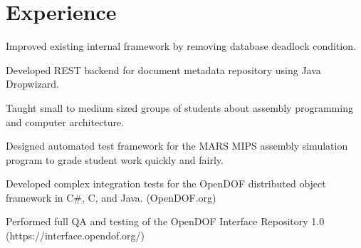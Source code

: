 \documentclass[letterpaper]{deedy-resume} %
\begin{document}
\begin{minipage}[t]{0.64\textwidth} %


\section{Experience}

\vspace{\topsep} %
\begin{tightitemize}
\item Improved existing internal framework by removing database deadlock condition.
\item Developed REST backend for document metadata repository using Java Dropwizard.
\end{tightitemize}


\begin{tightitemize}
\item Taught small to medium sized groups of students about assembly programming and computer architecture.
\item Designed automated test framework for the MARS MIPS assembly simulation program to grade student work quickly and fairly.
\end{tightitemize}


\vspace{\topsep} %
\begin{tightitemize}
\item Developed complex integration tests for the OpenDOF distributed object framework in C\#, C, and Java. (OpenDOF.org)
\item Performed full QA and testing of the OpenDOF Interface Repository 1.0 (https://interface.opendof.org/)
\end{tightitemize}


\end{minipage}
\end{document}

